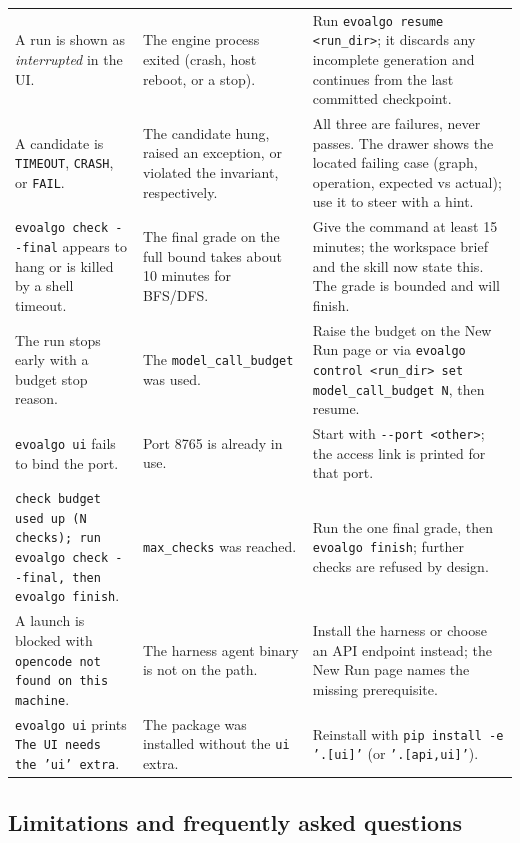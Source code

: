\begin{scriptsize}
\begin{longtable}{@{}p{}p{}p{}@{}}
\addlinespace[2pt]
A run is shown as \emph{interrupted} in the UI. & The engine process exited (crash, host reboot, or a stop). & Run \texttt{evoalgo resume <run\_dir>}; it discards any incomplete generation and continues from the last committed checkpoint. \\
\addlinespace[2pt]
A candidate is \texttt{TIMEOUT}, \texttt{CRASH}, or \texttt{FAIL}. & The candidate hung, raised an exception, or violated the invariant, respectively. & All three are failures, never passes. The drawer shows the located failing case (graph, operation, expected vs actual); use it to steer with a hint. \\
\addlinespace[2pt]
\texttt{evoalgo check -{}-final} appears to hang or is killed by a shell timeout. & The final grade on the full bound takes about 10 minutes for BFS/DFS. & Give the command at least 15 minutes; the workspace brief and the skill now state this. The grade is bounded and will finish. \\
\addlinespace[2pt]
The run stops early with a budget stop reason. & The \texttt{model\_call\_budget} was used. & Raise the budget on the New Run page or via \texttt{evoalgo control <run\_dir> set model\_call\_budget N}, then resume. \\
\addlinespace[2pt]
\texttt{evoalgo ui} fails to bind the port. & Port 8765 is already in use. & Start with \texttt{-{}-port <other>}; the access link is printed for that port. \\
\addlinespace[2pt]
\texttt{check budget used up (N checks); run evoalgo check -{}-final, then evoalgo finish}. & \texttt{max\_checks} was reached. & Run the one final grade, then \texttt{evoalgo finish}; further checks are refused by design. \\
\addlinespace[2pt]
A launch is blocked with \texttt{opencode not found on this machine}. & The harness agent binary is not on the path. & Install the harness or choose an API endpoint instead; the New Run page names the missing prerequisite. \\
\addlinespace[2pt]
\texttt{evoalgo ui} prints \texttt{The UI needs the 'ui' extra}. & The package was installed without the \texttt{ui} extra. & Reinstall with \texttt{pip install -e '.[ui]'} (or \texttt{'.[api,ui]'}). \\
\bottomrule
\end{longtable}
\end{scriptsize}

\subsection{Limitations and frequently asked questions}

